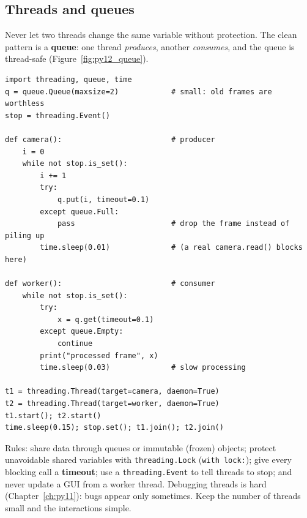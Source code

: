 \subsection*{Threads and queues}
Never let two threads change the same variable without protection. The clean pattern is a \textbf{queue}: one thread \emph{produces}, another \emph{consumes}, and the queue is thread-safe (Figure~\ref{fig:py12_queue}).
\begin{verbatim}
import threading, queue, time
q = queue.Queue(maxsize=2)            # small: old frames are worthless
stop = threading.Event()

def camera():                         # producer
    i = 0
    while not stop.is_set():
        i += 1
        try:
            q.put(i, timeout=0.1)
        except queue.Full:
            pass                      # drop the frame instead of piling up
        time.sleep(0.01)              # (a real camera.read() blocks here)

def worker():                         # consumer
    while not stop.is_set():
        try:
            x = q.get(timeout=0.1)
        except queue.Empty:
            continue
        print("processed frame", x)
        time.sleep(0.03)              # slow processing

t1 = threading.Thread(target=camera, daemon=True)
t2 = threading.Thread(target=worker, daemon=True)
t1.start(); t2.start()
time.sleep(0.15); stop.set(); t1.join(); t2.join()
\end{verbatim}
\begin{center}
\label{fig:py12_queue}
\end{center}
Rules: share data through queues or immutable (frozen) objects; protect unavoidable shared variables with \texttt{threading.Lock} (\verb!with lock:!); give every blocking call a \textbf{timeout}; use a \texttt{threading.Event} to tell threads to stop; and never update a GUI from a worker thread. Debugging threads is hard (Chapter~\ref{ch:py11}): bugs appear only sometimes. Keep the number of threads small and the interactions simple.

